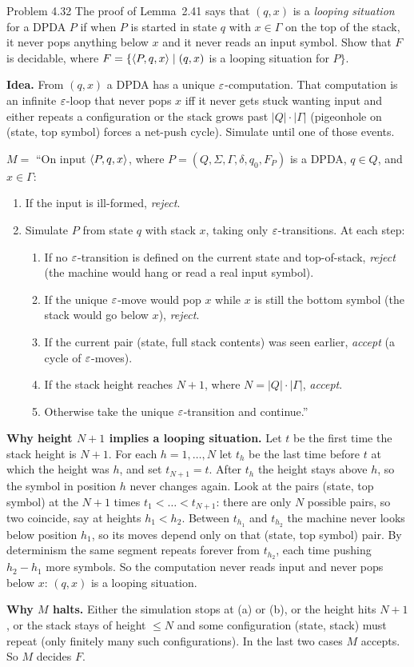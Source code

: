 \begin{question}{Problem 4.32}
The proof of Lemma~2.41 says that $(q,x)$ is a \emph{looping situation} for a DPDA $P$ if when $P$ is started in state $q$ with $x\in\Gamma$ on the top of the stack, it never pops anything below $x$ and it never reads an input symbol. Show that $F$ is decidable, where $F=\{\langle P,q,x\rangle\mid (q,x)$ is a looping situation for $P\}$.
\end{question}
\begin{soln}
\textbf{Idea.} From $(q,x)$ a DPDA has a unique $\varepsilon$-computation. That computation is an infinite $\varepsilon$-loop that never pops $x$ iff it never gets stuck wanting input and either repeats a configuration or the stack grows past $|Q|\cdot|\Gamma|$ (pigeonhole on (state, top symbol) forces a net-push cycle). Simulate until one of those events.

$M=$ ``On input $\langle P,q,x\rangle$, where $P=(Q,\Sigma,\Gamma,\delta,q_0,F_P)$ is a DPDA, $q\in Q$, and $x\in\Gamma$:
\begin{enumerate}
\item If the input is ill-formed, \emph{reject}.
\item Simulate $P$ from state $q$ with stack $x$, taking only $\varepsilon$-transitions. At each step:
\begin{enumerate}
\item If no $\varepsilon$-transition is defined on the current state and top-of-stack, \emph{reject} (the machine would hang or read a real input symbol).
\item If the unique $\varepsilon$-move would pop $x$ while $x$ is still the bottom symbol (the stack would go below $x$), \emph{reject}.
\item If the current pair (state, full stack contents) was seen earlier, \emph{accept} (a cycle of $\varepsilon$-moves).
\item If the stack height reaches $N+1$, where $N=|Q|\cdot|\Gamma|$, \emph{accept}.
\item Otherwise take the unique $\varepsilon$-transition and continue.''
\end{enumerate}
\end{enumerate}

\textbf{Why height $N+1$ implies a looping situation.} Let $t$ be the first time the stack height is $N+1$. For each $h=1,\dots,N$ let $t_h$ be the last time before $t$ at which the height was $h$, and set $t_{N+1}=t$. After $t_h$ the height stays above $h$, so the symbol in position $h$ never changes again. Look at the pairs (state, top symbol) at the $N+1$ times $t_1<\dots<t_{N+1}$: there are only $N$ possible pairs, so two coincide, say at heights $h_1<h_2$. Between $t_{h_1}$ and $t_{h_2}$ the machine never looks below position $h_1$, so its moves depend only on that (state, top symbol) pair. By determinism the same segment repeats forever from $t_{h_2}$, each time pushing $h_2-h_1$ more symbols. So the computation never reads input and never pops below $x$: $(q,x)$ is a looping situation.

\textbf{Why $M$ halts.} Either the simulation stops at (a) or (b), or the height hits $N+1$, or the stack stays of height $\le N$ and some configuration (state, stack) must repeat (only finitely many such configurations). In the last two cases $M$ accepts. So $M$ decides $F$.
\end{soln}
